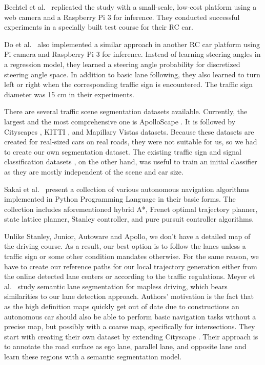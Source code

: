 Bechtel et al.\ \cite{Bechtel2017DeepPicarAL} replicated the study
\cite{Bojarski2016EndTE} with a small-scale, low-cost platform using a web
camera and a Raspberry Pi 3 for inference. They conducted successful
experiments in a specially built test course for their RC car.

Do et al.\ \cite{Do2018RealTimeSC} also implemented a similar approach in
another RC car platform using Pi camera and Raspberry Pi 3 for inference.
Instead of learning steering angles in a regression model, they learned a
steering angle probability for discretized steering angle space. In addition to
basic lane following, they also learned to turn left or right when the
corresponding traffic sign is encountered. The traffic sign diameter was 15 cm
in their experiments.

There are several traffic scene segmentation datasets available. Currently,
the largest and the most comprehensive one is ApolloScape
\cite{Huang2018TheAD}. It is followed by Cityscapes \cite{Cordts2016TheCD},
KITTI \cite{Geiger2012AreWR}, and Mapillary Vistas \cite{Neuhold2017TheMV}
datasets. Because these datasets are created for real-sized cars on real roads,
they were not suitable for us, so we had to create our own segmentation
dataset. The existing traffic sign and signal classification datasets
\cite{Timofte2009MultiviewTS, Stallkamp2012ManVC, Shakhuro2016RussianTS,
Serna2018ClassificationOT, MaldonadoBascn2007RoadSignDA}, on the other hand,
was useful to train an initial classifier as they are mostly independent of the
scene and car size.

Sakai et al.\ \cite{Kim2013SensorbasedMP} present a collection of various
autonomous navigation algorithms implemented in Python Programming Language in
their basic forms. The collection includes aforementioned hybrid A*, Frenet
optimal trajectory planner, state lattice planner, Stanley controller, and pure
pursuit controller algorithms.

Unlike Stanley, Junior, Autoware and Apollo, we don't have a detailed map of
the driving course. As a result, our best option is to follow the lanes unless
a traffic sign or some other condition mandates otherwise. For the same reason,
we have to create our reference paths for our local trajectory generation
either from the online detected lane centers or according to the traffic
regulations. Meyer et al.\ \cite{Meyer2018DeepSL} study semantic lane
segmentation for mapless driving, which bears similarities to our lane
detection approach. Authors' motivation is the fact that as the high definition
maps quickly get out of date due to constructions an autonomous car should also
be able to perform basic navigation tasks without a precise map, but possibly
with a coarse map, specifically for intersections. They start with creating
their own dataset by extending Cityscape \cite{Cordts2016TheCD}. Their approach
is to annotate the road surface as ego lane, parallel lane, and opposite lane
and learn these regions with a semantic segmentation model.

